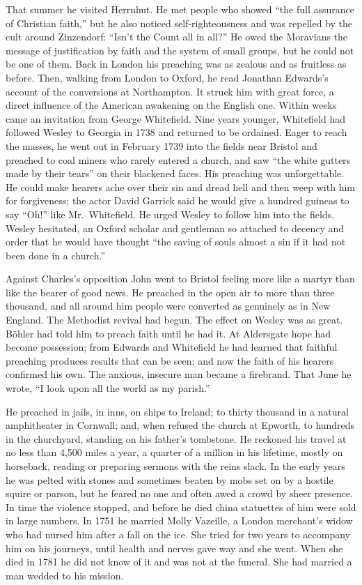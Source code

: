 That summer he visited Herrnhut. He met people who showed ``the full assurance of Christian faith,''
but he also noticed self-righteousness and was repelled by the cult around Zinzendorf: ``Isn't the
Count all in all?'' He owed the Moravians the message of justification by faith and the system of
small groups, but he could not be one of them. Back in London his preaching was as zealous and as
fruitless as before. Then, walking from London to Oxford, he read Jonathan Edwards's account of the
conversions at Northampton. It struck him with great force, a direct influence of the American
awakening on the English one. Within weeks came an invitation from George Whitefield. Nine years
younger, Whitefield had followed Wesley to Georgia in 1738 and returned to be ordained. Eager to
reach the masses, he went out in February 1739 into the fields near Bristol and preached to coal miners who rarely entered a church, and saw ``the white gutters made by their tears'' on their blackened
faces. His preaching was unforgettable. He could make hearers ache over their sin and dread hell and then weep with him for forgiveness; the actor David Garrick said he would give a hundred
guineas to say ``Oh!'' like Mr.~Whitefield. He urged Wesley to follow him into the fields. Wesley
hesitated, an Oxford scholar and gentleman so attached to decency and order that he would have
thought ``the saving of souls almost a sin if it had not been done in a church.''

Against Charles's opposition John went to Bristol feeling more like a martyr than like the bearer of good news. He
preached in the open air to more than three thousand, and all around him people were converted as genuinely as in New England. The Methodist revival had begun. The effect on Wesley was as great. B\"ohler
had told him to preach faith until he had it. At Aldersgate hope had become possession; from Edwards and Whitefield he had learned that faithful preaching produces results that can be seen; and now the faith of his hearers confirmed his own. The anxious, insecure man became a firebrand. That June
he wrote, ``I look upon all the world as my parish.''

He preached in jails, in inns, on ships to Ireland; to thirty thousand in a natural amphitheater in
Cornwall; and, when refused the church at Epworth, to hundreds in the churchyard, standing on his
father's tombstone. He reckoned his travel at no less than 4,500 miles a year, a quarter of a million
in his lifetime, mostly on horseback, reading or preparing sermons with the reins slack. In the early
years he was pelted with stones and sometimes beaten by mobs set on by a hostile squire or parson, but
he feared no one and often awed a crowd by sheer presence. In time the violence stopped, and before
he died china statuettes of him were sold in large numbers. In 1751 he married Molly Vazeille, a
London merchant's widow who had nursed him after a fall on the ice. She tried for two years to accompany him on his journeys, until health and nerves gave way and she went. When she died in 1781 he did not know of it
and was not at the funeral. She had married a man wedded to his mission.


